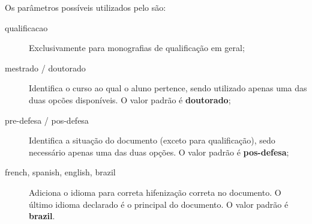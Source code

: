 Os parâmetros possíveis utilizados pelo  são:
\begin{description}
\item[qualificacao] Exclusivamente para monografias de qualificação em geral;
\item[mestrado / doutorado] Identifica o curso ao qual o aluno pertence, sendo utilizado apenas uma das duas opcões disponíveis. O valor padrão é \textbf{doutorado};
\item[pre-defesa / pos-defesa] Identifica a situação do documento (exceto para qualificação), sedo necessário apenas uma das duas opções. O valor padrão é \textbf{pos-defesa};
\item[french, spanish, english, brazil] Adiciona o idioma para correta hifenização correta no documento. O último idioma declarado é o principal do documento. O valor padrão é \textbf{brazil}.
\end{description}